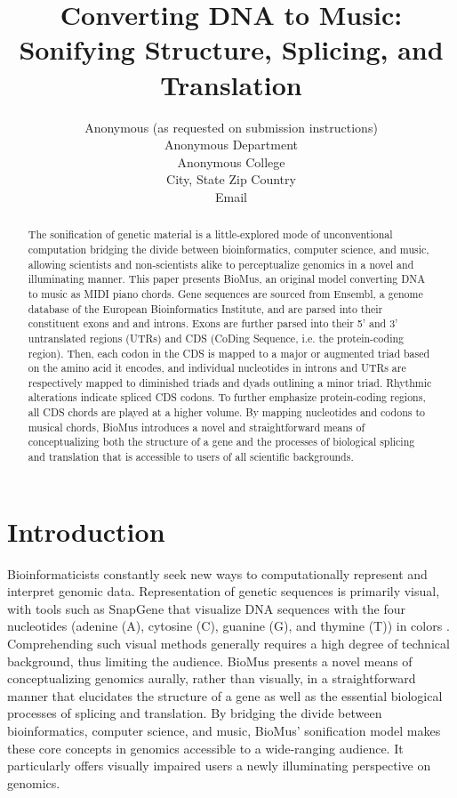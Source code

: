 \documentclass[letterpaper]{article}
\title{Converting DNA to Music: Sonifying Structure, Splicing, and Translation}
\author{Anonymous (as requested on submission instructions)\\
Anonymous Department\\
Anonymous College\\
City, State Zip Country\\
Email\\
}
\begin{document}
 
\maketitle
\begin{abstract}
The sonification of genetic material is a little-explored mode of unconventional computation bridging the divide between bioinformatics, computer science, and music, allowing scientists and non-scientists alike to perceptualize genomics in a novel and illuminating manner. This paper presents BioMus, an original model converting DNA to music as MIDI piano chords. Gene sequences are sourced from Ensembl, a genome database of the European Bioinformatics Institute, and are parsed into their constituent exons and and introns. Exons are further parsed into their 5’ and 3’ untranslated regions (UTRs) and CDS (CoDing Sequence, i.e. the protein-coding region). Then, each codon in the CDS is mapped to a major or augmented triad based on the amino acid it encodes, and individual nucleotides in introns and UTRs are respectively mapped to diminished triads and dyads outlining a minor triad. Rhythmic alterations indicate spliced CDS codons. To further emphasize protein-coding regions, all CDS chords are played at a higher volume. By mapping nucleotides and codons to musical chords, BioMus introduces a novel and straightforward means of conceptualizing both the structure of a gene and the processes of biological splicing and translation that is accessible to users of all scientific backgrounds.

\end{abstract}

\section{Introduction}
Bioinformaticists constantly seek new ways to computationally represent and interpret genomic data. Representation of genetic sequences is primarily visual, with tools such as SnapGene that visualize DNA sequences with the four nucleotides (adenine (A), cytosine (C), guanine (G), and thymine (T)) in colors \cite{goldstein_2023}.
Comprehending such visual methods generally requires a high degree of technical background, thus limiting the audience. BioMus presents a novel means of conceptualizing genomics aurally, rather than visually, in a straightforward manner that elucidates the structure of a gene as well as the essential biological processes of splicing and translation. By bridging the divide between bioinformatics, computer science, and music, BioMus’ sonification model makes these core concepts in genomics accessible to a wide-ranging audience. It particularly offers visually impaired users a newly illuminating perspective on genomics.
\end{document}
